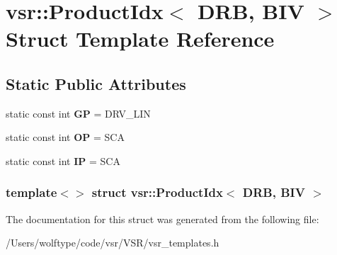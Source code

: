 \hypertarget{structvsr_1_1_product_idx_3_01_d_r_b_00_01_b_i_v_01_4}{\section{vsr\-:\-:Product\-Idx$<$ D\-R\-B, B\-I\-V $>$ Struct Template Reference}
\label{structvsr_1_1_product_idx_3_01_d_r_b_00_01_b_i_v_01_4}
}
\subsection*{Static Public Attributes}
\begin{DoxyCompactItemize}
\item 
\hypertarget{structvsr_1_1_product_idx_3_01_d_r_b_00_01_b_i_v_01_4_a18a11cb741c29ed5c8b9eac6401cfb7c}{static const int {\bfseries G\-P} = D\-R\-V\-\_\-\-L\-I\-N}\label{structvsr_1_1_product_idx_3_01_d_r_b_00_01_b_i_v_01_4_a18a11cb741c29ed5c8b9eac6401cfb7c}

\item 
\hypertarget{structvsr_1_1_product_idx_3_01_d_r_b_00_01_b_i_v_01_4_a2381dc382e81b326ec3cb5b4eb9e687f}{static const int {\bfseries O\-P} = S\-C\-A}\label{structvsr_1_1_product_idx_3_01_d_r_b_00_01_b_i_v_01_4_a2381dc382e81b326ec3cb5b4eb9e687f}

\item 
\hypertarget{structvsr_1_1_product_idx_3_01_d_r_b_00_01_b_i_v_01_4_afa0110089b7906b0757516e807e0601d}{static const int {\bfseries I\-P} = S\-C\-A}\label{structvsr_1_1_product_idx_3_01_d_r_b_00_01_b_i_v_01_4_afa0110089b7906b0757516e807e0601d}

\end{DoxyCompactItemize}
\subsubsection*{template$<$$>$ struct vsr\-::\-Product\-Idx$<$ D\-R\-B, B\-I\-V $>$}



The documentation for this struct was generated from the following file\-:\begin{DoxyCompactItemize}
\item 
/\-Users/wolftype/code/vsr/\-V\-S\-R/vsr\-\_\-templates.\-h\end{DoxyCompactItemize}
